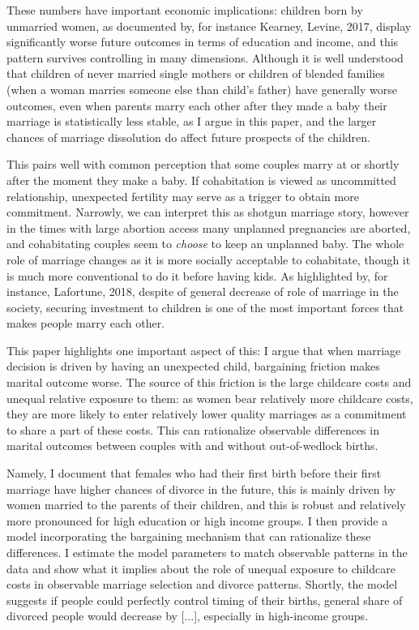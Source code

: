 \documentclass[12pt,letter]{article}
\begin{document}
These numbers have important economic implications: children born by unmarried women, as documented by, for instance Kearney, Levine, 2017, display significantly worse future outcomes in terms of education and income, and this pattern survives controlling in many dimensions. Although it is well understood that children of never married single mothers or children of blended families (when a woman marries someone else than child's father) have generally worse outcomes, even when parents marry each other after they made a baby their marriage is statistically less stable, as I argue in this paper, and the larger chances of marriage dissolution do affect future prospects of the children. 

This pairs well with common perception that some couples marry at or shortly after the moment they make a baby. If cohabitation is viewed as uncommitted relationship, unexpected fertility may serve as a trigger to obtain more commitment. Narrowly, we can interpret this as shotgun marriage story, however in the times with large abortion access many unplanned pregnancies are aborted, and cohabitating couples seem to \emph{choose} to keep an unplanned baby. The whole role of marriage changes as it is more socially acceptable to cohabitate, though it is much more conventional to do it before having kids. As highlighted by, for instance, Lafortune, 2018, despite of general decrease of role of marriage in the society, securing investment to children is one of the most important forces that makes people marry each other.

This paper highlights one important aspect of this: I argue that when marriage decision is driven by having an unexpected child, bargaining friction makes marital outcome worse. The source of this friction is the large childcare costs and unequal relative exposure to them: as women bear relatively more childcare costs, they are more likely to enter relatively lower quality marriages as a commitment to share a part of these costs. This can rationalize observable differences in marital outcomes between couples with and without out-of-wedlock births. 

Namely, I document that females who had their first birth before their first marriage have higher chances of divorce in the future, this is mainly driven by women married to the parents of their children, and this is robust and relatively more pronounced for high education or high income groups. I then provide a model incorporating the bargaining mechanism that can rationalize these differences. I estimate the model parameters to match observable patterns in the data and show what it implies about the role of unequal exposure to childcare costs in observable marriage selection and divorce patterns. Shortly, the model suggests if people could perfectly control timing of their births, general share of divorced people would decrease by [...], especially in high-income groups.
\end{document}
